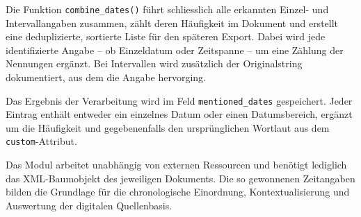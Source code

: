 \documentclass[12pt, a4paper, ngerman, bidi=default]{article}
\begin{document}
Die Funktion \texttt{combine\_dates()} führt schliesslich alle erkannten Einzel- und Intervallangaben zusammen, 
zählt deren Häufigkeit im Dokument und erstellt eine deduplizierte, sortierte Liste für den späteren Export. Dabei 
wird jede identifizierte Angabe – ob Einzeldatum oder Zeitspanne – um eine Zählung der Nennungen ergänzt. Bei 
Intervallen wird zusätzlich der Originalstring dokumentiert, aus dem die Angabe hervorging.

Das Ergebnis der Verarbeitung wird im Feld \texttt{mentioned\_dates} gespeichert. Jeder Eintrag enthält entweder 
ein einzelnes Datum oder einen Datumsbereich, ergänzt um die Häufigkeit und gegebenenfalls den ursprünglichen Wortlaut 
aus dem \texttt{custom}-Attribut.

Das Modul arbeitet unabhängig von externen Ressourcen und benötigt lediglich das XML-Baumobjekt des jeweiligen 
Dokuments. Die so gewonnenen Zeitangaben bilden die Grundlage für die chronologische Einordnung, 
Kontextualisierung und Auswertung der digitalen Quellenbasis.
\end{document}
